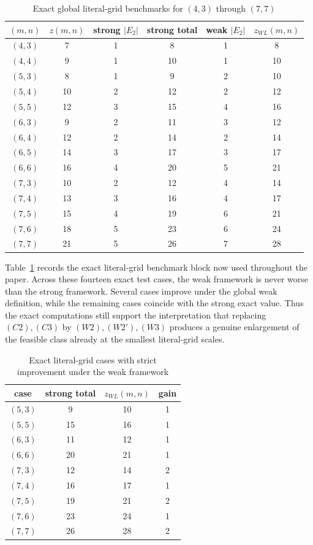 \documentclass[10pt]{article}
\newcommand{\blue}[1]{#1}
\newcommand{\0}{\mathbf{0}}
\newcommand{\1}{\mathbf{1}}
\begin{document}
\begin{table}[htbp]
\centering
\caption{\blue{Exact global literal-grid benchmarks for \((4,3)\) through \((7,7)\)}}
\label{tab:literal-benchmark-all}
\begin{tabular}{|c|c|c|c|c|c|}
\hline
\((m,n)\) & \(z(m,n)\) & strong \(|E_2|\) & strong total & weak \(|E_2|\) & \(z_{WL}(m,n)\) \\ \hline
\((4,3)\) & 7 & 1 & 8 & 1 & 8 \\
\((4,4)\) & 9 & 1 & 10 & 1 & 10 \\
\((5,3)\) & 8 & 1 & 9 & 2 & 10 \\
\((5,4)\) & 10 & 2 & 12 & 2 & 12 \\
\((5,5)\) & 12 & 3 & 15 & 4 & 16 \\
\((6,3)\) & 9 & 2 & 11 & 3 & 12 \\
\((6,4)\) & 12 & 2 & 14 & 2 & 14 \\
\((6,5)\) & 14 & 3 & 17 & 3 & 17 \\
\((6,6)\) & 16 & 4 & 20 & 5 & 21 \\
\((7,3)\) & 10 & 2 & 12 & 4 & 14 \\
\((7,4)\) & 13 & 3 & 16 & 4 & 17 \\
\((7,5)\) & 15 & 4 & 19 & 6 & 21 \\
\((7,6)\) & 18 & 5 & 23 & 6 & 24 \\
\((7,7)\) & 21 & 5 & 26 & 7 & 28 \\ \hline
\end{tabular}
\end{table}

\blue{Table~\ref{tab:literal-benchmark-all} records the exact literal-grid benchmark block now used throughout the paper. Across these fourteen exact test cases, the weak framework is never worse than the strong framework. Several cases improve under the global weak definition, while the remaining cases coincide with the strong exact value. Thus the exact computations still support the interpretation that replacing \((C2),(C3)\) by \((W2),(W2'),(W3)\) produces a genuine enlargement of the feasible class already at the smallest literal-grid scales.}

\begin{table}[htbp]
\centering
\caption{\blue{Exact literal-grid cases with strict improvement under the weak framework}}
\label{tab:w3-literal-improvements}
\begin{tabular}{|c|c|c|c|}
\hline
case & strong total & \(z_{WL}(m,n)\) & gain \\ \hline
\((5,3)\) & 9 & 10 & 1 \\
\((5,5)\) & 15 & 16 & 1 \\
\((6,3)\) & 11 & 12 & 1 \\
\((6,6)\) & 20 & 21 & 1 \\
\((7,3)\) & 12 & 14 & 2 \\
\((7,4)\) & 16 & 17 & 1 \\
\((7,5)\) & 19 & 21 & 2 \\
\((7,6)\) & 23 & 24 & 1 \\
\((7,7)\) & 26 & 28 & 2 \\ \hline
\end{tabular}
\end{table}
\end{document}
